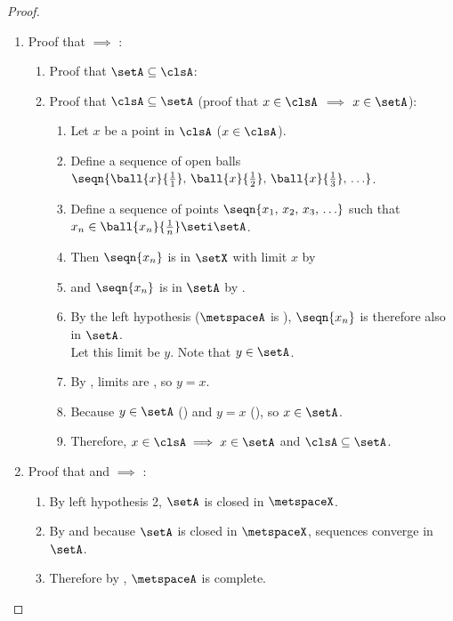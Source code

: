 \begin{proof}
\begin{enumerate}
\item Proof that  $\implies$ :
\begin{enumerate}
  \item Proof that $\setA\subseteq\clsA$: 
  \item Proof that $\clsA\subseteq\setA$ (proof that $x\in\clsA$ $\implies$ $x\in\setA$):
    \begin{enumerate}
      \item Let $x$ be a point in $\clsA$ ($x\in\clsA$).
      \item Define a sequence of open balls $\seqn{\ball{x}{\frac{1}{1}},\,\ball{x}{\frac{1}{2}},\,\ball{x}{\frac{1}{3}},\,\ldots}$.
      \item Define a sequence of points $\seqn{x_1,\,x_2,\,x_3,\,\ldots}$ such that $x_n\in\ball{x_n}{\frac{1}{n}}\seti\setA$.
      \item Then $\seqn{x_n}$ is  in $\setX$ with limit $x$ by 
      \item and  $\seqn{x_n}$ is  in $\setA$ by .
      \item By the left hypothesis ($\metspaceA$ is ), $\seqn{x_n}$ is therefore also  in $\setA$.\\
            Let this limit be $y$. Note that $y\in\setA$.\label{item:com_cls_yY}
      \item By , limits are , so $y=x$. \label{item:com_cls_yx}
      \item Because $y\in\setA$ () and $y=x$ (), so $x\in\setA$.
      \item Therefore, $x\in\clsA\implies x\in\setA$ and $\clsA\subseteq\setA$.
    \end{enumerate}
\end{enumerate}

\item Proof that  and  $\implies$ :

  \begin{enumerate}
    \item By left hypothesis 2, $\setA$ is closed in $\metspaceX$.
    \item By  and because $\setA$ is closed in $\metspaceX$,
          sequences converge in $\setA$.
    \item Therefore by , $\metspaceA$ is complete.
  \end{enumerate}
\end{enumerate}
\end{proof}

